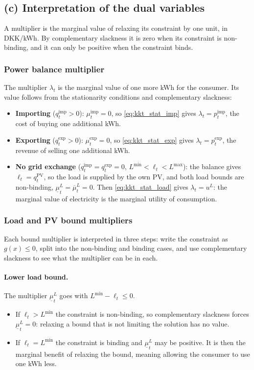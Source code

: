 \subsection{(c) Interpretation of the dual variables}

A multiplier is the marginal value of relaxing its constraint by one unit, in DKK/kWh. By
complementary slackness it is zero when its constraint is non-binding, and it can only be
positive when the constraint binds.

\subsubsection{Power balance multiplier}
The multiplier $\lambda_t$ is the marginal value of one more kWh for the consumer. Its value
follows from the stationarity conditions and complementary slackness:
\begin{itemize}
    \item \textbf{Importing} ($q_t^{\mathrm{imp}}>0$): $\mu_t^{\mathrm{imp}}=0$, so
    \eqref{eq:kkt_stat_imp} gives $\lambda_t=p_t^{\mathrm{imp}}$, the cost of buying one
    additional kWh.
    \item \textbf{Exporting} ($q_t^{\mathrm{exp}}>0$): $\mu_t^{\mathrm{exp}}=0$, so
    \eqref{eq:kkt_stat_exp} gives $\lambda_t=p_t^{\mathrm{exp}}$, the revenue of selling one
    additional kWh.
    \item \textbf{No grid exchange}
    ($q_t^{\mathrm{imp}}=q_t^{\mathrm{exp}}=0$, $L^{\min}<\ell_t<L^{\max}$): the balance gives
    $\ell_t=q_t^{\mathrm{PV}}$, so the load is supplied by the own PV, and both load bounds are
    non-binding, $\underline{\mu}_t^L=\overline{\mu}_t^L=0$. Then \eqref{eq:kkt_stat_load}
    gives $\lambda_t=u^L$: the marginal value of electricity is the marginal utility of
    consumption.
\end{itemize}

\subsubsection{Load and PV bound multipliers}
Each bound multiplier is interpreted in three steps: write the constraint as
$g(x)\leq 0$, split into the non-binding and binding cases, and use complementary slackness
to see what the multiplier can be in each.

\paragraph{Lower load bound.}
The multiplier $\underline{\mu}_t^L$ goes with $L^{\min}-\ell_t\leq 0$.
\begin{itemize}
    \item If $\ell_t>L^{\min}$ the constraint is non-binding, so complementary slackness
    forces $\underline{\mu}_t^L=0$: relaxing a bound that is not limiting the solution has
    no value.
    \item If $\ell_t=L^{\min}$ the constraint is binding and $\underline{\mu}_t^L$ may be
    positive. It is then the marginal benefit of relaxing the bound, meaning allowing the
    consumer to use one kWh less.
\end{itemize}

